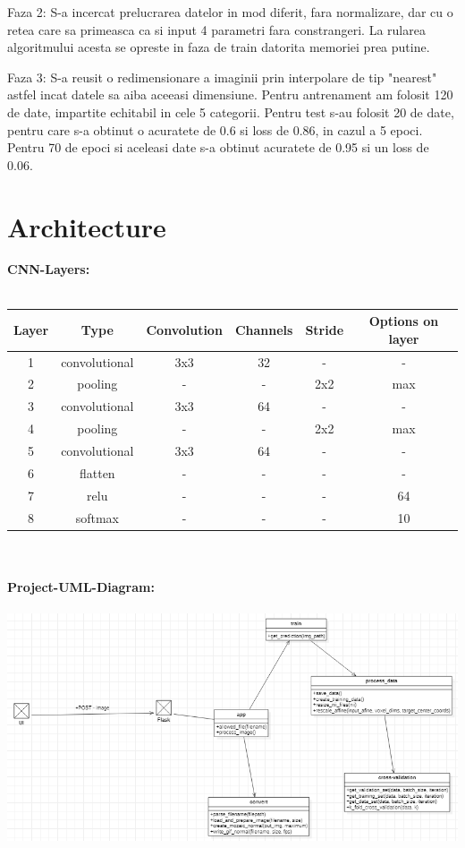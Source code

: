 \documentclass[a4papaer,12pt]{article}
\begin{document}
Faza 2:
S-a incercat prelucrarea datelor in mod diferit, fara normalizare, dar cu o retea care sa primeasca ca si input 4 parametri fara constrangeri. La rularea algoritmului acesta se opreste in faza de train datorita memoriei prea putine.

Faza 3:
S-a reusit o redimensionare a imaginii prin interpolare de tip "nearest" astfel incat datele sa aiba aceeasi dimensiune. Pentru antrenament am folosit 120 de date, impartite echitabil in cele 5 categorii. Pentru test s-au folosit 20 de date, pentru care s-a obtinut o acuratete de 0.6 si loss de 0.86, in cazul a 5 epoci. 
\\
Pentru 70 de epoci si aceleasi date s-a obtinut acuratete de 0.95 
si un loss de 0.06.
\newpage
\section{Architecture}

\indent \textbf{CNN-Layers:}
\\
\\
\begin{tabular}{|c|c|c|c|c|c|}
	\hline
	Layer & Type & Convolution & Channels & Stride & Options on layer\\
	\hline
	1 & convolutional & 3x3 & 32 & - & - \\
	\hline
	2 & pooling & - & - & 2x2 & max \\
	\hline
	3 & convolutional & 3x3 & 64 & - & - \\
	\hline
	4 & pooling & - & - & 2x2 & max \\	
	\hline
	5 & convolutional & 3x3 & 64 & - & - \\
	\hline
	6 & flatten & - & - & - & -\\	
	\hline
	7 & relu & - & - & - & 64 \\
	\hline
	8 & softmax & - & - & - & 10\\
	\hline
\end{tabular}
\\
\\
\indent \textbf{Project-UML-Diagram:}
\\
\\
\includegraphics[scale=0.75]{diagrama.png}
\end{document}
